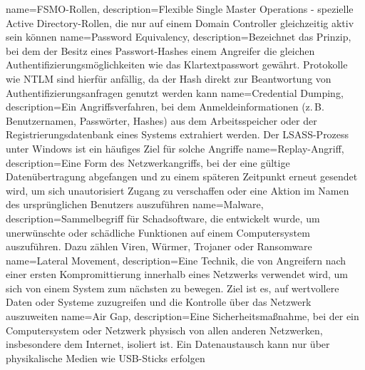 {
	name={FSMO-Rol\-len},
	description={Fle\-xi\-ble Sin\-gle Mas\-ter Ope\-ra\-tions - spe\-zi\-el\-le Ac\-tive Di\-rec\-to\-ry-Rol\-len, die nur auf ei\-nem Do\-main Con\-trol\-ler gleich\-zei\-tig ak\-tiv sein kön\-nen}
}
{
	name={Pass\-word Equi\-va\-len\-cy},
	description={Be\-zeich\-net das Prin\-zip, bei dem der Be\-sitz ei\-nes Pass\-wort-Ha\-shes ei\-nem An\-grei\-fer die glei\-chen Au\-then\-ti\-fi\-zie\-rungs\-mög\-lich\-kei\-ten wie das Klar\-text\-pass\-wort ge\-währt. Pro\-to\-kol\-le wie NTLM sind hier\-für an\-fäl\-lig, da der Hash di\-rekt zur Be\-ant\-wor\-tung von Au\-then\-ti\-fi\-zie\-rungs\-an\-fra\-gen ge\-nutzt wer\-den kann}
}
{
	name={Cre\-den\-tial Dum\-ping},
	description={Ein An\-griffs\-ver\-fah\-ren, bei dem An\-mel\-de\-in\-for\-ma\-tio\-nen (z.\,B. Be\-nut\-zer\-na\-men, Pass\-wör\-ter, Ha\-shes) aus dem Ar\-beits\-spei\-cher oder der Re\-gis\-trie\-rungs\-da\-ten\-bank ei\-nes Sys\-tems ex\-tra\-hiert wer\-den. Der LSASS-Pro\-zess un\-ter Win\-dows ist ein häu\-fi\-ges Ziel für sol\-che An\-grif\-fe}
}
{
	name={Re\-play-An\-griff},
	description={Eine Form des Netz\-werk\-an\-griffs, bei der eine gül\-ti\-ge Da\-ten\-über\-tra\-gung ab\-ge\-fan\-gen und zu ei\-nem spä\-te\-ren Zeit\-punkt er\-neut ge\-sen\-det wird, um sich un\-au\-to\-ri\-siert Zu\-gang zu ver\-schaf\-fen oder eine Ak\-ti\-on im Na\-men des ur\-sprüng\-li\-chen Be\-nut\-zers aus\-zu\-füh\-ren}
}
{
	name={Mal\-ware},
	description={Sam\-mel\-be\-griff für Schad\-soft\-ware, die ent\-wi\-ckelt wur\-de, um un\-er\-wünsch\-te oder schäd\-li\-che Funk\-tio\-nen auf ei\-nem Com\-pu\-ter\-sys\-tem aus\-zu\-füh\-ren. Da\-zu zäh\-len Vi\-ren, Wür\-mer, Tro\-ja\-ner oder Rans\-om\-ware}
}
{
	name={La\-te\-ral Mo\-ve\-ment},
	description={Eine Tech\-nik, die von An\-grei\-fern nach ei\-ner ers\-ten Kom\-pro\-mit\-tie\-rung in\-ner\-halb ei\-nes Netz\-werks ver\-wen\-det wird, um sich von ei\-nem Sys\-tem zum nächs\-ten zu be\-we\-gen. Ziel ist es, auf wert\-vol\-le\-re Da\-ten oder Sys\-te\-me zu\-zu\-grei\-fen und die Kon\-trol\-le über das Netz\-werk aus\-zu\-wei\-ten}
}
{
	name={Air Gap},
	description={Eine Si\-cher\-heits\-maß\-nah\-me, bei der ein Com\-pu\-ter\-sys\-tem oder Netz\-werk phy\-sisch von al\-len an\-de\-ren Netz\-wer\-ken, ins\-be\-son\-de\-re dem In\-ter\-net, iso\-liert ist. Ein Da\-ten\-aus\-tausch kann nur über phy\-si\-ka\-li\-sche Me\-di\-en wie USB-Sticks er\-fol\-gen}
}
